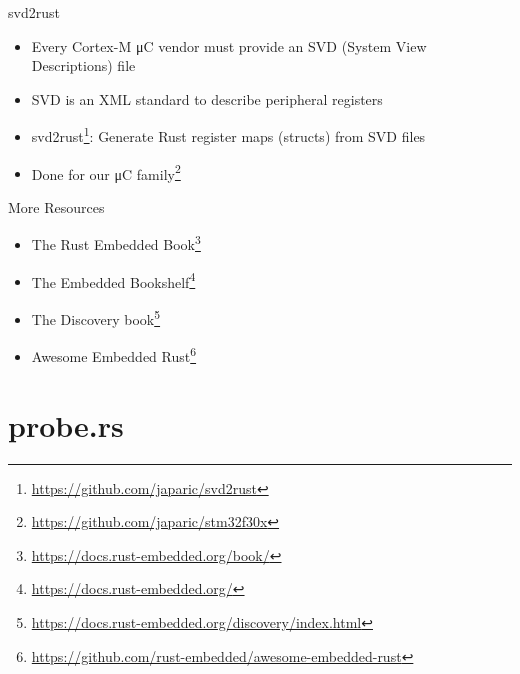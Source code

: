 \documentclass[aspectratio=1610,14pt,t]{beamer}
\begin{document}
\begin{frame}[c]{svd2rust}
  \begin{itemize}
    \item Every Cortex-M μC vendor must provide an SVD (System View
      Descriptions) file
    \item SVD is an XML standard to describe peripheral registers
    \item svd2rust\footnote{\url{https://github.com/japaric/svd2rust}}:
      Generate Rust register maps (structs) from SVD files
    \item Done for our μC family\footnote{\url{https://github.com/japaric/stm32f30x}}
  \end{itemize}
\end{frame}

\begin{frame}[c]{More Resources}
  \begin{itemize}
    \item The Rust Embedded Book\footnote{\url{https://docs.rust-embedded.org/book/}}
    \item The Embedded Bookshelf\footnote{\url{https://docs.rust-embedded.org/}}
    \item The Discovery book\footnote{\url{https://docs.rust-embedded.org/discovery/index.html}}
    \item Awesome Embedded Rust\footnote{\url{https://github.com/rust-embedded/awesome-embedded-rust}}
  \end{itemize}
\end{frame}

\section{probe.rs}
\end{document}
